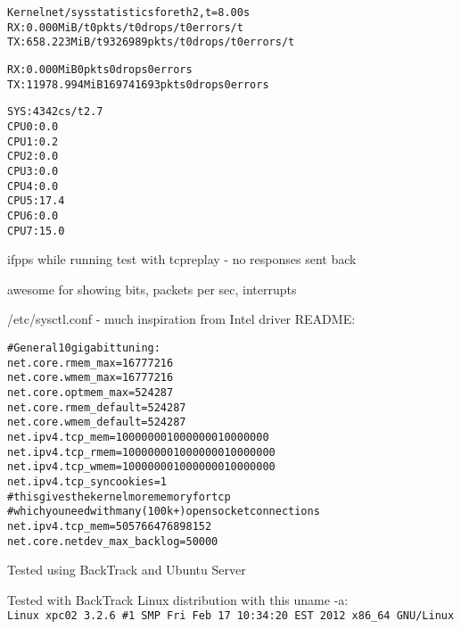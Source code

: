\documentclass[20pt,landscape,a4paper,footrule]{foils}
\begin{document}
\begin{alltt}\scriptsize
Kernel net/sys statistics for eth2, t=8.00s
  RX:            0.000 MiB/t          0 pkts/t          0 drops/t          0 errors/t  
  TX:          658.223 MiB/t    9326989 pkts/t          0 drops/t          0 errors/t  
 
  RX:            0.000 MiB            0 pkts            0 drops            0 errors 
  TX:        11978.994 MiB    169741693 pkts            0 drops            0 errors
 
  SYS:            4342 cs/t        2.7% mem             4 running          0 iowait
  CPU0:           0.0% usr/t       0.1% sys/t       99.9% idl/t         0.0% iow/t
  CPU1:           0.2% usr/t       1.0% sys/t       98.8% idl/t         0.0% iow/t
  CPU2:           0.0% usr/t       0.0% sys/t      100.0% idl/t         0.0% iow/t
  CPU3:           0.0% usr/t       0.0% sys/t      100.0% idl/t         0.0% iow/t
  CPU4:           0.0% usr/t       2.7% sys/t       97.3% idl/t         0.0% iow/t
  CPU5:          17.4% usr/t      81.5% sys/t        1.1% idl/t         0.0% iow/t
  CPU6:           0.0% usr/t       0.0% sys/t      100.0% idl/t         0.0% iow/t
  CPU7:          15.0% usr/t      85.0% sys/t        0.0% idl/t         0.0% iow/t
\end{alltt}

ifpps while running test with tcpreplay - no responses sent back

awesome for showing bits, packets per sec, interrupts



/etc/sysctl.conf - much inspiration from Intel driver README:
\begin{alltt}\scriptsize
# General 10 gigabit tuning:
net.core.rmem_max = 16777216
net.core.wmem_max = 16777216
net.core.optmem_max = 524287
net.core.rmem_default = 524287
net.core.wmem_default = 524287
net.ipv4.tcp_mem = 10000000 10000000 10000000
net.ipv4.tcp_rmem = 10000000 10000000 10000000
net.ipv4.tcp_wmem = 10000000 10000000 10000000
net.ipv4.tcp_syncookies = 1
# this gives the kernel more memory for tcp
# which you need with many (100k+) open socket connections
net.ipv4.tcp_mem = 50576   64768   98152
net.core.netdev_max_backlog = 50000
\end{alltt}

\centerline{Tested using BackTrack and Ubuntu Server}
Tested with BackTrack Linux distribution with this uname -a:\\
{\small \verb+Linux xpc02 3.2.6 #1 SMP Fri Feb 17 10:34:20 EST 2012 x86_64 GNU/Linux+}
\end{document}

